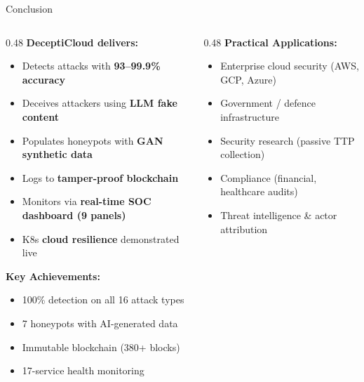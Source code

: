 \documentclass[aspectratio=169,12pt]{beamer}
\newcommand{\yes}{\textcolor{dcGreen}{$\checkmark$}}
\begin{document}
\begin{frame}{Conclusion}
  \begin{columns}[T]
    \begin{column}{0.48\textwidth}
      \textbf{\textcolor{dcCyan}{DeceptiCloud delivers:}}
      \begin{itemize}\small
        \item Detects attacks with \textbf{93--99.9\% accuracy}
        \item Deceives attackers using \textbf{LLM fake content}
        \item Populates honeypots with \textbf{GAN synthetic data}
        \item Logs to \textbf{tamper-proof blockchain}
        \item Monitors via \textbf{real-time SOC dashboard (9 panels)}
        \item K8s \textbf{cloud resilience} demonstrated live
      \end{itemize}
      \vspace{0.2em}
      \textbf{\textcolor{dcGreen}{Key Achievements:}}
      \begin{itemize}\small
        \item[\yes] 100\% detection on all 16 attack types
        \item[\yes] 7 honeypots with AI-generated data
        \item[\yes] Immutable blockchain (380+ blocks)
        \item[\yes] 17-service health monitoring
      \end{itemize}
    \end{column}
    \begin{column}{0.48\textwidth}
      \textbf{\textcolor{dcYellow}{Practical Applications:}}
      \begin{itemize}\small
        \item Enterprise cloud security (AWS, GCP, Azure)
        \item Government / defence infrastructure
        \item Security research (passive TTP collection)
        \item Compliance (financial, healthcare audits)
        \item Threat intelligence \& actor attribution
      \end{itemize}
      \vspace{0.2em}

\end{column}
\end{columns}
\end{frame}
\end{document}
